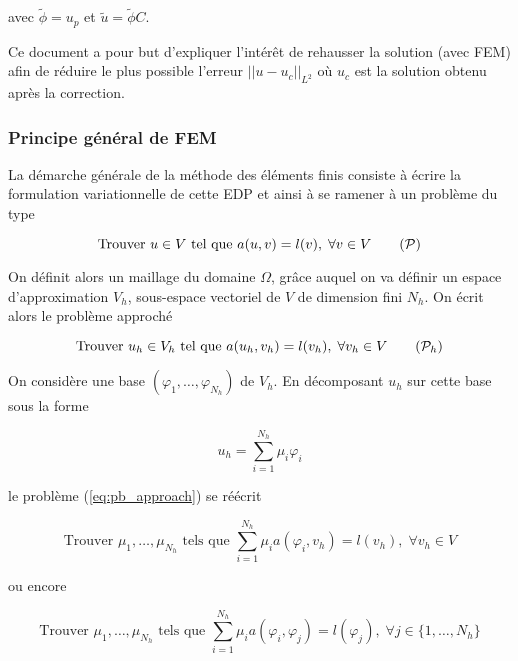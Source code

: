 avec $\tilde{\phi}=u_p$ et $\tilde{u}=\tilde{\phi}C$.

Ce document a pour but d'expliquer l'intérêt de rehausser la solution (avec FEM) afin de réduire le plus possible l'erreur $||u-u_{c}||_{L^2}$ où $u_{c}$ est la solution obtenu après la correction.

\subsubsection*{Principe général de FEM}

La démarche générale de la méthode des éléments finis consiste à écrire la formulation variationnelle de cette EDP et ainsi à se ramener à un problème du type

\begin{equation}
	\text{Trouver } u\in V \text{ tel que } a(u,v)=l(v), \;\forall v\in V \tag{$\mathcal{P}$}
\end{equation}

On définit alors un maillage du domaine $\Omega$, grâce auquel on va définir un espace d'approximation $V_h$, sous-espace vectoriel de $V$ de dimension fini $N_h$. On écrit alors le problème approché

\begin{equation}
	\text{Trouver } u_h\in V_h \text{ tel que } a(u_h,v_h)=l(v_h), \;\forall v_h\in V \tag{$\mathcal{P}_h$} \label{eq:pb_approach}
\end{equation}

On considère une base $(\varphi_1,\dots,\varphi_{N_h})$ de $V_h$. En décomposant $u_h$ sur cette base sous la forme

\begin{equation}
	\label{decomp1}
	u_h=\sum_{i=1}^{N_h}\mu_i\varphi_i	
\end{equation}

le problème (\ref{eq:pb_approach}) se réécrit 

\begin{equation*}
	\text{Trouver } \mu_1,\dots,\mu_{N_h} \text{ tels que } \sum_{i=1}^{N_h}\mu_i a(\varphi_i,v_h)=l(v_h), \;\forall v_h\in V 
\end{equation*}

ou encore

\begin{equation*}
	\text{Trouver } \mu_1,\dots,\mu_{N_h} \text{ tels que } \sum_{i=1}^{N_h}\mu_i a(\varphi_i,\varphi_j)=l(\varphi_j), \;\forall j\in \{1,\dots,N_h\}
\end{equation*}

